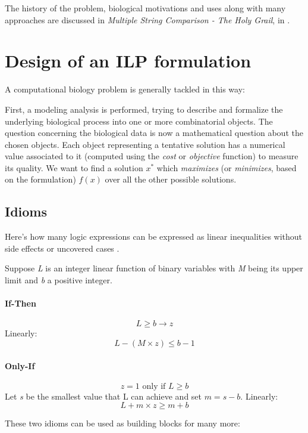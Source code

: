 The history of the problem, biological motivations and uses along with many approaches are discussed in \textit{Multiple String Comparison - The Holy Grail}, in \cite{Gusfield:1997:AST:262228}.

\section{Design of an ILP formulation}

A computational biology problem is generally tackled in this way:

First, a modeling analysis is performed, trying to describe and formalize the underlying biological process into one or more combinatorial objects. The question concerning the biological data is now a mathematical question about the chosen objects. Each object representing a tentative solution has a numerical value associated to it (computed using the \textit{cost} or \textit{objective} function) to measure its quality. We want to find a solution $x^*$ which \textit{maximizes} (or \textit{minimizes}, based on the formulation) $f(x)$ over all the other possible solutions.


\subsection{Idioms}

Here's how many logic expressions can be expressed as linear inequalities without side effects or uncovered cases \cite{gusfieldilp}.

Suppose \textit{L} is an integer linear function of binary variables with \textit{M} being its upper limit and \textit{b} a positive integer.

\paragraph{If-Then}

$$ L \geq b \rightarrow z$$
Linearly:
$$ L - (M \times z) \leq  b - 1$$


\paragraph{Only-If}

$$ \text{$z = 1$ only if $L \geq b$}$$
Let \textit{s} be the smallest value that L can achieve and set $m = s - b$. Linearly:
$$ L + m \times z \geq m + b$$

These two idioms can be used as building blocks for many more:

